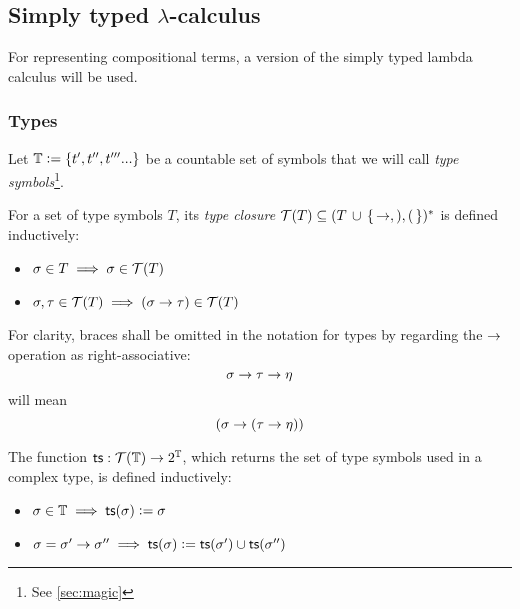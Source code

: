 \documentclass[main.tex]{subfiles}
\begin{document}
\subsection{Simply typed $\lambda$-calculus}
\label{sec:purelambda}

For representing compositional terms, a version of the simply typed lambda calculus
will be used.

\subsubsection{Types}
\label{purelambda:types}
Let $\mathbb{T} \vcentcolon= \{ t', t'', t''' ... \}$ be a countable set of symbols that we will call
    \emph{type symbols}\footnote{See \cref{sec:magic}}.

\begin{defn}
    \label{def:tclos}
    For a set of type symbols $T$, its \emph{type closure}
    $\mathcal{T}( T ) \subseteq (T \, \cup \,\{\, \rightarrow, ), ( \,\})^*$ is defined
    inductively:

    \begin{itemize}
        \item $\sigma \in T \implies \sigma \in \mathcal{T}( T )$
        \item $\sigma, \tau \in \mathcal{T}( T ) \implies (\sigma \rightarrow \tau) \in \mathcal{T}( T )$
    \end{itemize}
\end{defn}

\begin{convention}
    For clarity, braces shall be omitted in the notation for types by regarding
    the $\rightarrow$ operation as right-associative:
    \[ \sigma \rightarrow \tau \rightarrow \eta \]
    will mean
    \[ ( \sigma \rightarrow ( \tau \rightarrow \eta ) ) \]
\end{convention}

\begin{defn}
    The function $\mathsf{ts} : \mathcal{T}( \mathbb{T} ) \rightarrow 2^{\mathbb{T}}$, which
    returns the set of type symbols used in a complex type, is defined inductively:

    \begin{itemize}
        \item $\sigma \in \mathbb{T} \implies \mathsf{ts}(\sigma) \vcentcolon= \sigma$
        \item $\sigma = \sigma' \rightarrow \sigma'' \implies
            \mathsf{ts}(\sigma) \vcentcolon= \mathsf{ts}(\sigma') \cup \mathsf{ts}(\sigma'')$
    \end{itemize}
\end{defn}
\end{document}
